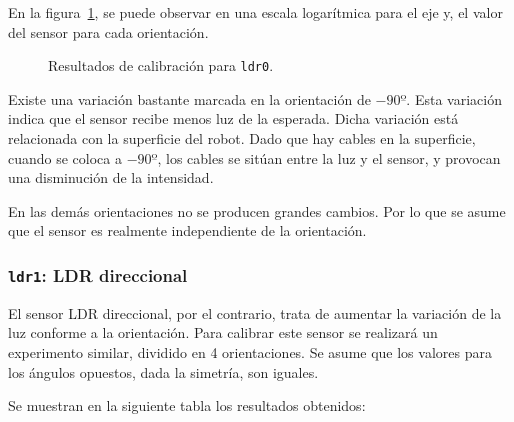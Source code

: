\documentclass[10pt,a4paper,hidelinks,twocolumn]{article}
\begin{document}
En la figura~\ref{fig:ldr0}, se puede observar en una escala logarítmica para el 
eje y, el valor del sensor para cada orientación.

\begin{figure}[h]
\centering
{}
\caption{Resultados de calibración para \texttt{ldr0}.\label{fig:ldr0}}
\end{figure}

Existe una variación bastante marcada en la orientación de $-90º$. Esta 
variación indica que el sensor recibe menos luz de la esperada. Dicha variación 
está relacionada con la superficie del robot. Dado que hay cables en la 
superficie, cuando se coloca a $-90º$, los cables se sitúan entre la luz y el 
sensor, y provocan una disminución de la intensidad.

En las demás orientaciones no se producen grandes cambios. Por lo que se asume 
que el sensor es realmente independiente de la orientación.
\subsubsection{\texttt{ldr1}: LDR direccional}
El sensor LDR direccional, por el contrario, trata de aumentar la variación de 
la luz conforme a la orientación. Para calibrar este sensor se realizará un 
experimento similar, dividido en 4 orientaciones. Se asume que los valores para 
los ángulos opuestos, dada la simetría, son iguales.

Se muestran en la siguiente tabla los resultados obtenidos:
\end{document}
